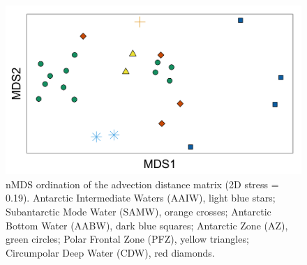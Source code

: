 \begin{figure}[!ht]
  \centering
  \includegraphics[width=\textwidth]{../advection/nMDSadvection.png}
  \caption[nMDS of advective distances between samples.]{nMDS ordination of the advection distance matrix (2D stress = 0.19). Antarctic Intermediate Waters (AAIW), light blue stars; Subantarctic Mode Water (SAMW), orange crosses; Antarctic Bottom Water (AABW), dark blue squares; Antarctic Zone (AZ), green circles; Polar Frontal Zone (PFZ), yellow triangles; Circumpolar Deep Water (CDW), red diamonds.}
  \label{fig:nMDSadvection}
\end{figure}
